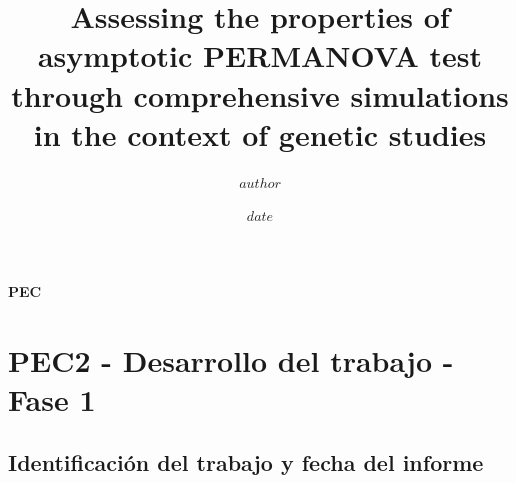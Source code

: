 \documentclass[IB,BIB]{TFUOC}%
\title{Assessing the properties of asymptotic \break PERMANOVA test through comprehensive \break simulations in the context of genetic studies} %
\author{$author$} %
\date{$date$}
\let\oldgls=\gls
\renewcommand{\gls}[1]{{\hypersetup{linkcolor=[RGB]{0,0,0}}
  \oldgls{#1}}}
\begin{document}
\estructura\label{fitxa}

\renewcommand{\bibname}{Referencias}  
\renewcommand{\tablename}{Tabla}
\renewcommand{\figurename}{Figura}
\renewcommand{\listfigurename}{Índice de figuras}
\renewcommand{\listtablename}{Índice de tablas}

\renewcommand*{\glstextformat}{\textbf}

\newpage

\clearpage
{}

\footnotesize %
\tableofcontents
\normalsize

\newpage

\listoffigures


\newpage

\listoftables


\newpage

\listofmyequations


\newpage\null\thispagestyle{empty} %

\Huge
\vfill

\textbf{PEC}
\normalsize

\newpage





\setcounter{chapter}{-1} %
\chapter{PEC2 - Desarrollo del trabajo - Fase 1}
\label{chap:PEC2 - Desarrollo del trabajo - Fase 1}


\section{Identificación del trabajo y fecha del informe}
\label{sec:Identificación del trabajo y fecha del informe}
\end{document}
